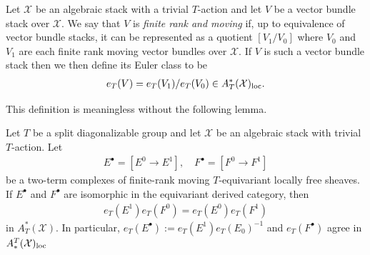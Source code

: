 \documentclass[12pt,dvipsnames]{amsart}
\begin{document}
\begin{definition}\label{rl-000T}\label{defn:euler-class-of-vector-bundle-stack}
  Let \(\mathcal X\) be an algebraic stack with a trivial \(T\)-action and let $V$ be a vector bundle stack over $\mathcal X$. We say that \(V\) is \emph{finite rank and moving} if, up to equivalence of vector bundle stacks, it can be represented as a quotient \([V_1/V_0]\) where \(V_0\) and \(V_1\) are each finite rank moving vector bundles over \(\mathcal X\). If \(V\) is such a vector bundle stack then we then define its Euler class to be
  \begin{align*}
    e_T(V) = e_T(V_1)/e_T(V_0) \in A^*_T(\mathcal X)_{\operatorname{loc}}.
  \end{align*}
\end{definition}


This definition is meaningless without the following lemma.

\begin{lemma}\label{rl-000U}\label{lem:euler-class-well-defined}
  Let \(T\) be a split diagonalizable group and let \(\mathcal X\) be an algebraic stack with trivial \(T\)-action. Let
  \begin{align*}
    E^\bullet = [E^0 \to E^1], \hspace{1em} F^\bullet = [F^0 \to F^1]
  \end{align*}
  be a two-term complexes of finite-rank moving \(T\)-equivariant locally free sheaves. If \(E^\bullet\) and \(F^\bullet\) are isomorphic in the equivariant derived category, then
  \begin{align*}
    e_T(E^1)e_T(F^0) = e_T(E^0)e_T(F^1)
  \end{align*}
  in \(A^*_T(\mathcal X)\). In particular, \(e_T(E^\bullet) := e_T(E^1)e_T(E_0)^{-1}\) and \(e_T(F^\bullet)\) agree in \(A_*^T(\mathcal X)_{\operatorname{loc}}\)
\end{lemma}
\end{document}
